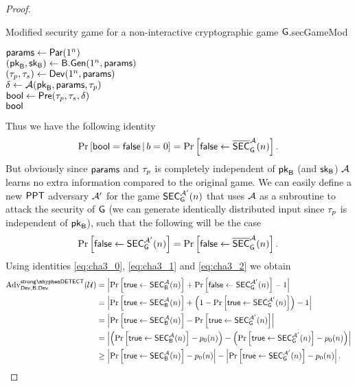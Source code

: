 \begin{proof}
\begin{boxfigGame}{Modified security game for a non-interactive cryptographic game $\operatorname{\mathsf{G}}$.}{secGameMod}
\begin{description}
 		$\mathsf{params} \leftarrow \operatorname{\mathsf{Par}}(1^n)$ \\
 		$(\mathsf{pk}_{\mathsf{B}},\mathsf{sk}_{\mathsf{B}})\leftarrow \mathsf{B}.\mathsf{Gen}(1^n,\mathsf{params})$ \\
 		$(\tau_p,\tau_s)\leftarrow \operatorname{\mathsf{Dev}}(1^n,\mathsf{params})$ \\
 		$\delta \leftarrow \mathcal{A}(\mathsf{pk}_{\mathsf{B}},\mathsf{params},\tau_p)$ \\
 		$\mathsf{bool} \leftarrow \operatorname{\mathsf{Pre}}(\tau_p,\tau_s,\delta)$ \\
		\Ret $\mathsf{bool}$	
  \end{description}
\end{boxfigGame}

Thus we have the following identity
\begin{align*}
	\operatorname{Pr}\left[\mathsf{bool} = \mathsf{false}\,\vert\,b = 0\right] = \operatorname{Pr}\left[{\mathsf{false} \leftarrow \overline{\mathstrut\mathsf{SEC}}_{\operatorname{\mathsf{G}}}^{\mathcal{A}}(n)}\right].
\end{align*}
But obviously since $\mathsf{params}$ and $\tau_p$ is completely independent of $\mathsf{pk}_{\mathsf{B}}$ (and $\mathsf{sk}_{\mathsf{B}}$) $\mathcal{A}$ learns no extra information compared to the original game. We can easily define a new $\mathsf{PPT}$ adversary $\mathcal{A}'$ for the game $\mathsf{SEC}_{\operatorname{\mathsf{G}}}^{\mathcal{A}'}(n)$ that uses $\mathcal{A}$ as a subroutine to attack the security of $\operatorname{\mathsf{G}}$ (we can generate identically distributed input since $\tau_p$ is independent of $\mathsf{pk}_{\mathsf{B}}$), such that the following will be the case
\begin{align}
\label{eq:cha3_2}
	\operatorname{Pr}\left[{\mathsf{false}\leftarrow \mathsf{SEC}_{\operatorname{\mathsf{G}}}^{\mathcal{A}'}(n)}\right] = \operatorname{Pr}\left[{\mathsf{false} \leftarrow \overline{\mathstrut\mathsf{SEC}}_{\operatorname{\mathsf{G}}}^{\mathcal{A}}(n)}\right].
\end{align}
Using identities \ref{eq:cha3_0}, \ref{eq:cha3_1} and \ref{eq:cha3_2} we obtain
\begin{align*}
	\adv_{\dev,\bbdev}^{\strongdetectplain}(\user) & = \left\vert \prob{\true\leftarrow \secgame_{\bb}^{\adve}(n)} + \prob{\false \leftarrow \secgame_{\cgame}^{\adve'}(n)} - 1\right\vert \\
	& = \left\vert \prob{\true\leftarrow \secgame_{\bb}^{\adve}(n)} + \left( 1 - \prob{\true \leftarrow \secgame_{\cgame}^{\adve'}(n)}\right) - 1\right\vert \\
	& = \left\vert \prob{\true\leftarrow \secgame_{\bb}^{\adve}(n)} - \prob{\true \leftarrow \secgame_{\cgame}^{\adve'}(n)}\right\vert \\
	& = \left\vert \left(\prob{ \true\leftarrow \secgame_{\bb}^{\adve}(n)} - \basep(n)\right)  - \left( \prob{\true \leftarrow \secgame_{\cgame}^{\adve'}(n)} - \basep(n) \right)\right\vert \\ 
	& \geq \left\vert \prob{ \true\leftarrow \secgame_{\bb}^{\adve}(n)} - \basep(n)\right\vert  - \left\vert \prob{\true \leftarrow \secgame_{\cgame}^{\adve'}(n)} - \basep(n) \right\vert.

\end{align*}
\end{proof}
